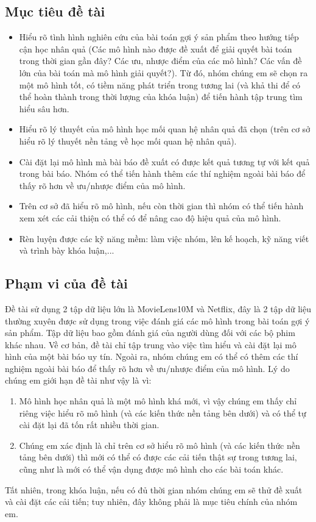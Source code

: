 \documentclass{article}[14pt]
\begin{document}
{    \subsection{Mục tiêu đề tài}
    \begin{itemize}
        \item Hiểu rõ tình hình nghiên cứu của bài toán gợi ý sản phẩm theo hướng tiếp cận học nhân quả (Các mô hình nào được đề xuất để giải quyết bài toán trong thời gian gần đây? Các ưu, nhược điểm của các mô hình? Các vấn đề lớn của bài toán mà mô hình giải quyết?). Từ đó, nhóm chúng em sẽ chọn ra một mô hình tốt, có tiềm năng phát triển trong tương lai (và khả thi để có thể hoàn thành trong thời lượng của khóa luận) để tiến hành tập trung tìm hiểu sâu hơn.
        \item Hiểu rõ lý thuyết của mô hình học mối quan hệ nhân quả đã chọn (trên cơ sở hiểu rõ lý thuyết nền tảng về học mối quan hệ nhân quả).
        \item Cài đặt lại mô hình mà bài báo đề xuất có được kết quả tương tự với kết quả trong bài báo. Nhóm có thể tiến hành thêm các thí nghiệm ngoài bài báo để thấy rõ hơn về ưu/nhược điểm của mô hình.
        \item Trên cơ sở đã hiểu rõ mô hình, nếu còn thời gian thì nhóm có thể tiến hành xem xét các cải thiện có thể có để nâng cao độ hiệu quả của mô hình.
        \item Rèn luyện được các kỹ năng mềm: làm việc nhóm, lên kế hoạch, kỹ năng viết và trình bày khóa luận,...

    \end{itemize}{}
    
    \subsection{Phạm vi của đề tài}
    
    Đề tài sử dụng 2 tập dữ liệu lớn là MovieLens10M và Netflix, đây là 2 tập dữ liệu thường xuyên được sử dụng trong việc đánh giá các mô hình trong bài toán gợi ý sản phẩm. Tập dữ liệu bao gồm đánh giá của người dùng đối với các bộ phim khác nhau. Về cơ bản, đề tài chỉ tập trung vào việc tìm hiểu và cài đặt lại mô hình của một bài báo uy tín. Ngoài ra, nhóm chúng em có thể có thêm các thí nghiệm ngoài bài báo để thấy rõ hơn về ưu/nhược điểm của mô hình. Lý do chúng em giới hạn đề tài như vậy là vì: 
    \begin{enumerate}[label=(\roman*)]
        \item Mô hình học nhân quả là một mô hình khá mới, vì vậy chúng em thấy chỉ riêng việc hiểu rõ mô hình (và các kiến thức nền tảng bên dưới) và có thể tự cài đặt lại đã tốn rất nhiều thời gian.
        \item Chúng em xác định là chỉ trên cơ sở hiểu rõ mô hình (và các kiến thức nền tảng bên dưới) thì mới có thể có được các cải tiến thật sự trong tương lai, cũng như là mới có thể vận dụng được mô hình cho các bài toán khác.
    \end{enumerate}
    Tất nhiên, trong khóa luận, nếu có đủ thời gian nhóm chúng em sẽ thử đề xuất và cài đặt các cải tiến; tuy nhiên, đây không phải là mục tiêu chính của nhóm em.
    
}
\end{document}
